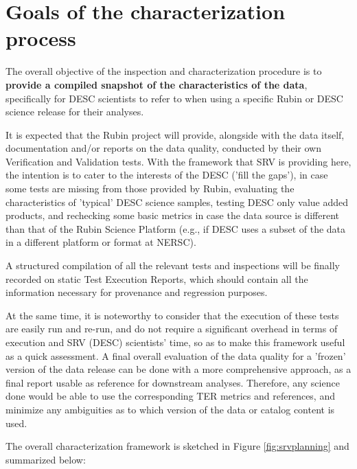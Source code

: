 \documentclass[12pt, a4paper]{article}
\begin{document}
\section{Goals of the characterization process}

The overall objective of the inspection and characterization procedure is to \textbf{provide a compiled snapshot of the characteristics of the data}, specifically for DESC scientists to refer to when using a specific Rubin or DESC science release for their analyses.

It is expected that the Rubin project will provide, alongside with the data itself, documentation and/or reports on the data quality, conducted by their own Verification and Validation tests. With the framework that SRV is providing here, the intention is to cater to the interests of the DESC ('fill the gaps'), in case some tests are missing from those provided by Rubin, evaluating the characteristics of 'typical' DESC science samples, testing DESC only value added products, and rechecking some basic metrics in case the data source is different than that of the Rubin Science Platform (e.g., if DESC uses a subset of the data in a different platform or format at NERSC).

A structured compilation of all the relevant tests and inspections will be finally recorded on static Test Execution Reports, which should contain all the information necessary for provenance and regression purposes.

At the same time, it is noteworthy to consider that the execution of these tests are easily run and re-run, and do not require a significant overhead in terms of execution and SRV (DESC) scientists' time, so as to make this framework useful as a quick assessment. A final overall evaluation of the data quality for a 'frozen' version of the data release can be done with a more comprehensive approach, as a final report usable as reference for downstream analyses. Therefore, any science done would be able to use the corresponding TER metrics and references, and minimize any ambiguities as to which version of the data or catalog content is used.

The overall characterization framework is sketched in Figure \ref{fig:srvplanning} and summarized below:
\end{document}

